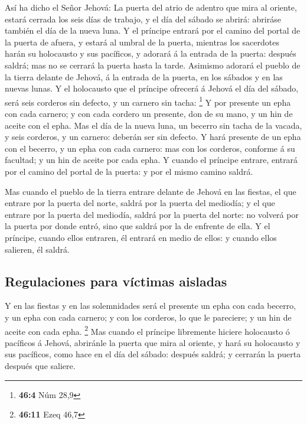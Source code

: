  Así ha dicho el Señor Jehová: La puerta del atrio de
adentro que mira al oriente, estará cerrada los seis días de trabajo, y
el día del sábado se abrirá: abriráse también el día de la nueva luna.
 Y el príncipe entrará por el camino del portal de la puerta
de afuera, y estará al umbral de la puerta, mientras los sacerdotes
harán su holocausto y sus pacíficos, y adorará á la entrada de la
puerta: después saldrá; mas no se cerrará la puerta hasta la tarde.
 Asimismo adorará el pueblo de la tierra delante de Jehová,
á la entrada de la puerta, en los sábados y en las nuevas lunas.
 Y el holocausto que el príncipe ofrecerá á Jehová el día
del sábado, será seis corderos sin defecto, y un carnero sin tacha:
\footnote{\textbf{46:4} Núm 28,9}  Y por presente un epha
con cada carnero; y con cada cordero un presente, don de su mano, y un
hin de aceite con el epha.  Mas el día de la nueva luna, un
becerro sin tacha de la vacada, y seis corderos, y un carnero: deberán
ser sin defecto.  Y hará presente de un epha con el becerro,
y un epha con cada carnero: mas con los corderos, conforme á su
facultad; y un hin de aceite por cada epha.  Y cuando el
príncipe entrare, entrará por el camino del portal de la puerta: y por
el mismo camino saldrá.

 Mas cuando el pueblo de la tierra entrare delante de Jehová
en las fiestas, el que entrare por la puerta del norte, saldrá por la
puerta del mediodía; y el que entrare por la puerta del mediodía, saldrá
por la puerta del norte: no volverá por la puerta por donde entró, sino
que saldrá por la de enfrente de ella.  Y el príncipe,
cuando ellos entraren, él entrará en medio de ellos: y cuando ellos
salieren, él saldrá.

\hypertarget{regulaciones-para-vuxedctimas-aisladas}{%
\subsection{Regulaciones para víctimas
aisladas}\label{regulaciones-para-vuxedctimas-aisladas}}

 Y en las fiestas y en las solemnidades será el presente un
epha con cada becerro, y un epha con cada carnero; y con los corderos,
lo que le pareciere; y un hin de aceite con cada epha. \footnote{\textbf{46:11}
  Ezeq 46,7}  Mas cuando el príncipe libremente hiciere
holocausto ó pacíficos á Jehová, abriránle la puerta que mira al
oriente, y hará su holocausto y sus pacíficos, como hace en el día del
sábado: después saldrá; y cerrarán la puerta después que saliere.

